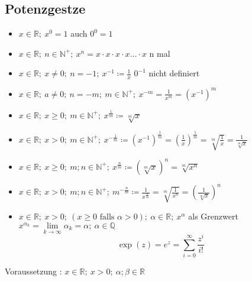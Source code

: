 \subsection{Potenzgestze}
\begin{itemize}
    \item $x \in \mathbb{R};\ x^0 = 1$ auch $0^0=1$
    \item $x \in \mathbb{R};\ n \in \mathbb{N}^+;\ x^n = x \cdot x \cdot x \cdot x \dots \cdot x$ n mal
    \item $x \in \mathbb{R};\ x \not = 0;\ n = -1;\ x^{-1} \coloneqq \frac{1}{x}$ $0^{-1}$ nicht definiert
    \item $x \in \mathbb{R};\ a \not = 0;\ n = -m;\ m \in \mathbb{N}^+;\ x^{-m} = \frac{1}{x^{m}} = (x^{-1})^m$
    \item $x \in \mathbb{R};\ x \geq 0;\ m \in \mathbb{N}^+;\ x^{\frac{1}{m}} \coloneqq \sqrt[m]{x}$
    \item $x \in\mathbb{R};\ x > 0;\ m \in \mathbb{N}^+;\ x^{-\frac{1}{m}} \coloneqq (x^{-1})^{\frac{1}{m}}= (\frac{1}{x})^{\frac{1}{m}}=\sqrt[m]{\frac{1}{x}} = \frac{1}{\sqrt[m]{x}}$
    \item $x \in\mathbb{R};\ x \geq 0;\ m;n \in \mathbb{N}^+;\ x^{\frac{n}{m}} \coloneqq \left(\sqrt[m]{x}\right)^n = \sqrt[m]{x^n}$
    \item $x \in \mathbb{R};\ x > 0;\ m;n \in \mathbb{N}^+;\ m^{-\frac{n}{m}} \coloneqq \frac{1}{x^{\frac{n}{m}}} = \sqrt[m]{\frac{1}{x^n}} = \left(\frac{1}{\sqrt[m]{x}}\right)^n$
    \item $x \in \mathbb{R};\ x > 0;\ (x \geq 0 \textrm{ falls } \alpha > 0);\ \alpha \in \mathbb{R};\ x^\alpha$ als Grenzwert $x^{\alpha_k} = \lim\limits_{k \to \infty}\alpha_k = \alpha;\ \alpha \in \mathbb{Q}$
    $$\exp(z) = e^z = \sum\limits_{i = 0}^\infty \frac{z^i}{i!}$$
\end{itemize}
Voraussetzung : $x \in \mathbb{R};\ x > 0;\ \alpha; \beta \in \mathbb{R}$
